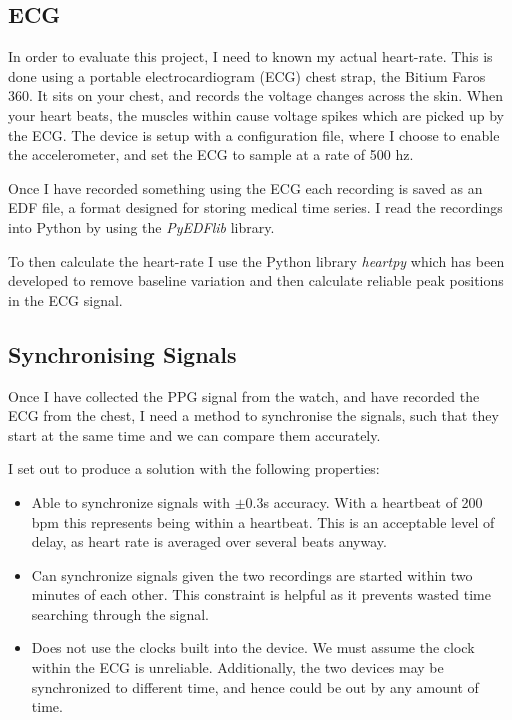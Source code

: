 \documentclass[12pt,a4paper,twoside,openright]{report}
\begin{document}
\subsection{ECG}

In order to evaluate this project, I need to known my actual heart-rate. This
is done using a portable electrocardiogram (ECG) chest strap, the Bitium Faros
360. It sits on your chest, and records the voltage changes across the skin.
When your heart beats, the muscles within cause voltage spikes which are
picked up by the ECG. The device is setup with a configuration 
file, where I choose to enable
the accelerometer, and set the ECG to sample at a rate of 500 hz.

Once I have recorded something using the ECG 
each recording is saved as an EDF file, a format
designed for storing medical time series. I read the recordings into Python
by using the \emph{PyEDFlib} library.

To then calculate the heart-rate I use the Python library \emph{heartpy} which
has been developed to remove baseline variation and then calculate reliable
peak positions in the ECG signal.

\subsection{Synchronising Signals} \label{sec:sync}

Once I have collected the PPG signal from the watch, and have recorded the ECG
from the chest, I need a method to synchronise the signals, such that they
start at the same time and we can compare them accurately.

I set out to produce a solution with the following properties:
\begin{itemize}
	\item Able to synchronize signals with \(\pm0.3\)s accuracy. With a
		heartbeat of 200 bpm this represents being within a heartbeat.
		This is an acceptable level of delay, as heart rate is
		averaged over several beats anyway.

	\item Can synchronize signals given the two recordings are started
		within two minutes of each other. This constraint is helpful
		as it prevents wasted time searching through the signal.

	\item Does not use the clocks built into the device. We must assume
		the clock within the ECG is unreliable. Additionally, the two
		devices may be synchronized to different time, and hence could
		be out by any amount of time.
\end{itemize}
\end{document}
